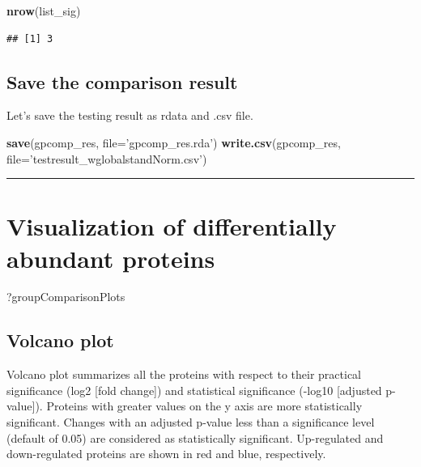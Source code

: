 \documentclass[]{book}
\newenvironment{Shaded}{\begin{snugshade}}{\end{snugshade}}
\newcommand{\DataTypeTok}[1]{\textcolor[rgb]{0.13,0.29,0.53}{#1}}
\newcommand{\KeywordTok}[1]{\textcolor[rgb]{0.13,0.29,0.53}{\textbf{#1}}}
\newcommand{\NormalTok}[1]{#1}
\newcommand{\StringTok}[1]{\textcolor[rgb]{0.31,0.60,0.02}{#1}}
\begin{document}
\begin{Shaded}
\begin{Highlighting}[]
\KeywordTok{nrow}\NormalTok{(list_sig)}
\end{Highlighting}
\end{Shaded}

\begin{verbatim}
## [1] 3
\end{verbatim}

\hypertarget{save-the-comparison-result}{%
\subsection{Save the comparison result}\label{save-the-comparison-result}}

Let's save the testing result as rdata and .csv file.

\begin{Shaded}
\begin{Highlighting}[]
\KeywordTok{save}\NormalTok{(gpcomp_res, }\DataTypeTok{file=}\StringTok{'gpcomp_res.rda'}\NormalTok{)}
\KeywordTok{write.csv}\NormalTok{(gpcomp_res, }\DataTypeTok{file=}\StringTok{'testresult_wglobalstandNorm.csv'}\NormalTok{)}
\end{Highlighting}
\end{Shaded}

\begin{center}\rule{0.5\linewidth}{\linethickness}\end{center}

\hypertarget{visualization-of-differentially-abundant-proteins}{%
\section{Visualization of differentially abundant proteins}\label{visualization-of-differentially-abundant-proteins}}

\begin{Shaded}
\begin{Highlighting}[]
\NormalTok{?groupComparisonPlots}
\end{Highlighting}
\end{Shaded}

\hypertarget{volcano-plot}{%
\subsection{Volcano plot}\label{volcano-plot}}

Volcano plot summarizes all the proteins with respect to their practical significance (log2 {[}fold change{]}) and statistical significance (-log10 {[}adjusted p-value{]}). Proteins with greater values on the y axis are more statistically significant. Changes with an adjusted p-value less than a significance level (default of 0.05) are considered as statistically significant. Up-regulated and down-regulated proteins are shown in red and blue, respectively.
\end{document}
